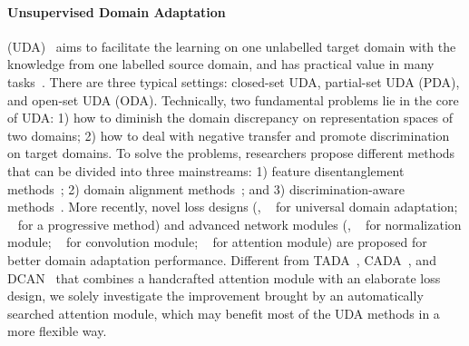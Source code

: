\documentclass[10pt,twocolumn,letterpaper]{article}
\begin{document}
\paragraph{Unsupervised Domain Adaptation} (UDA)~\cite{ganin2015DANN,long2017JAN,chen2019BSP} aims to facilitate the learning on one unlabelled target domain with the knowledge from one labelled source domain, and has practical value in many tasks~\cite{ge2020MMT,wang2020PAN,chen2021DGFaceAntiSpoofing}.
There are three typical settings: closed-set UDA, partial-set UDA (PDA), and open-set UDA (ODA). Technically, two fundamental problems lie in the core of UDA: 1) how to diminish the domain discrepancy on representation spaces of two domains; 2) how to deal with negative transfer and promote discrimination on target domains.
To solve the problems, researchers propose different methods that can be divided into three mainstreams: 1) feature disentanglement methods~\cite{wang2019TN,li2020DCAN}; 2) domain alignment methods~\cite{saito2018MCD,long2018CDAN}; and 3) discrimination-aware methods~\cite{zou2019CRST,cui2020BNM,liang2020shot}.
More recently, novel loss designs (\eg, ~\cite{you2019UAN,saito2020DANCE} for universal domain adaptation; ~\cite{cui2020HDA} for a progressive method) and advanced network modules (\eg, ~\cite{wang2019TN} for normalization module; ~\cite{wang2020DAFD} for convolution module; ~\cite{wang2019TADA,kurmi2019CADA,li2020DCAN} for attention module) are proposed for better domain adaptation performance.
Different from TADA~\cite{wang2019TADA}, CADA~\cite{kurmi2019CADA}, and DCAN~\cite{li2020DCAN} that combines a handcrafted attention module with an elaborate loss design, we solely investigate the improvement brought by an automatically searched attention module, which may benefit most of the \SOTA UDA methods in a more flexible way. 



\vspace{-4mm}
\end{document}
